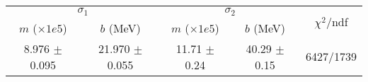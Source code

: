 \begin{tabular}{cc|cc||c}
\multicolumn{2}{c|}{$\sigma_1$} & \multicolumn{2}{|c}{$\sigma_2$} & \multirow{2}{*}{$\chi^2/$ndf} \\
$m$ ($\times1e5$) & $b$ (MeV) & $m$ ($\times1e5$) & $b$ (MeV) & \\
\hline
8.976 $\pm$ 0.095 & 21.970 $\pm$ 0.055 & 11.71 $\pm$ 0.24 & 40.29 $\pm$ 0.15 & 6427/1739\\
\end{tabular}
